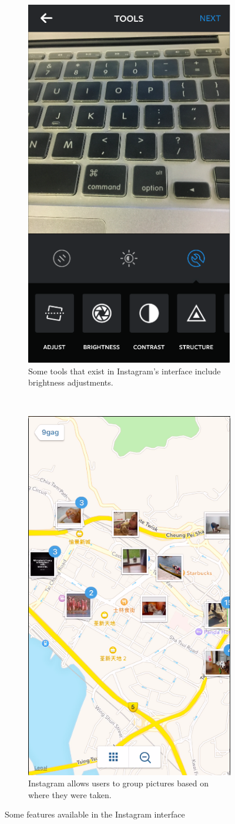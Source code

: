 \documentclass[11pt]{article}
\begin{document}
\begin{figure}
\centering
\begin{subfigure}[b]{.5\textwidth}
   \centering
    \includegraphics[height=\textwidth]{images/instagram_tools.png}
    \caption{Some tools that exist in Instagram's interface include brightness adjustments.}
    \label{tools}
\end{subfigure}%
~~~~~~~
\begin{subfigure}[b]{.5\textwidth}
    \centering
    \includegraphics[height=\textwidth]{images/maps_with_pictures.png}
    \caption{Instagram allows users to group pictures based on where they were taken.}
    \label{instagram_pictures}
\end{subfigure}
\caption{Some features available in the Instagram interface}
\end{figure}
\end{document}
